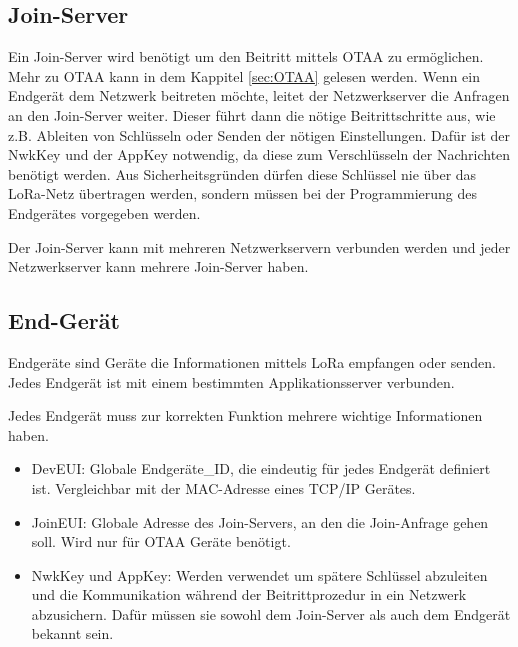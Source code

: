 \documentclass[a4paper, 12pt]{article}
\begin{document}
        \subsection{Join-Server}
            Ein Join-Server wird benötigt um den Beitritt mittels OTAA zu ermöglichen. Mehr zu OTAA kann in dem 
            Kappitel \ref{sec:OTAA}  gelesen werden. Wenn ein Endgerät dem Netzwerk beitreten möchte, leitet 
            der Netzwerkserver die Anfragen an den Join-Server weiter. Dieser führt dann die nötige Beitrittschritte 
            aus, wie z.B. Ableiten von Schlüsseln oder Senden der nötigen Einstellungen. Dafür ist der NwkKey und 
            der AppKey notwendig, da diese zum Verschlüsseln der Nachrichten benötigt werden. 
            Aus Sicherheitsgründen dürfen diese Schlüssel nie über das LoRa-Netz übertragen werden, sondern müssen
            bei der Programmierung des Endgerätes vorgegeben werden. \cite[S. 9 f.]{LoRaBack}

            Der Join-Server kann mit mehreren Netzwerkservern verbunden werden und jeder Netzwerkserver kann mehrere 
            Join-Server haben.
        \subsection{End-Gerät}\label{sec:endgerät}
            Endgeräte sind Geräte die Informationen mittels LoRa empfangen oder senden. Jedes Endgerät ist mit einem 
            bestimmten Applikationsserver verbunden.

            Jedes Endgerät muss zur korrekten Funktion mehrere wichtige Informationen haben.
            \begin{itemize}
                \item DevEUI: Globale Endgeräte\_ID, die eindeutig für jedes Endgerät definiert ist. Vergleichbar 
                mit der MAC-Adresse eines TCP/IP Gerätes.
                \item JoinEUI: Globale Adresse des Join-Servers, an den die Join-Anfrage gehen soll. Wird nur für OTAA Geräte
                benötigt.
                \item NwkKey und AppKey: Werden verwendet um spätere Schlüssel abzuleiten und die Kommunikation während
                der Beitrittprozedur in ein Netzwerk abzusichern. Dafür müssen sie sowohl dem Join-Server als auch dem
                Endgerät bekannt sein.
            \end{itemize}
            \cite[S.47 ff.]{LoRaSpec}
\end{document}
